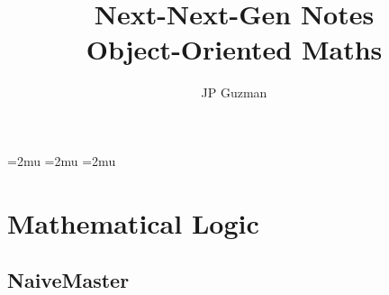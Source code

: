 \documentclass[a4paper]{article}
\title{Next-Next-Gen Notes \\
\large Object-Oriented Maths}
\author{JP Guzman}
\begin{document}
\maketitle
\allowdisplaybreaks


\thinmuskip=2mu %
\medmuskip=2mu %
\thickmuskip=2mu %
\setlength{\belowdisplayskip}{0pt} \setlength{\belowdisplayshortskip}{0pt}
\setlength{\abovedisplayskip}{0pt} \setlength{\abovedisplayshortskip}{0pt}


\section{Mathematical Logic}
\subsection{NaiveMaster}
\end{document}
